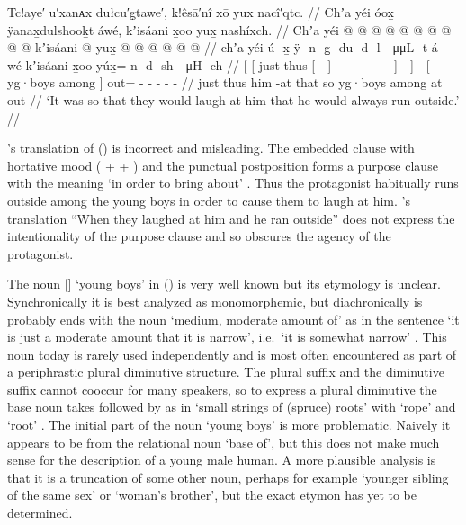 \ex\label{ex:89-148-run-out-to-get-laughed-at}%
%
\begingl
	\glpreamble	Tc!aye′ u′xanᴀx dułcu′g̣tawe′, k!êsā′nî xō yux nacî′qtc. //
	\glpreamble	Chʼa yéi óox̱ ÿanax̱dulshooḵt áwé, kʼisáani x̱oo yux̱ nashíxch. //
	\gla	{} {} Chʼa yéi {}  @ {} {}
			 @ {} @ {} @ {} @ {} @ {} @ {} @ {} @ {} {} {} {}
		 @ {}
		{} kʼisáani  @ {} {}
		yux̱ @  @ {} @ {} @ {} @ {} @ {} //
	\glb	{} {} chʼa yéi {} ú -x̱ {}
			ÿ- n- g̱- du- d- l-  -μμL {} {} -t {}
		á -wé
		{} kʼisáani x̱oo {} {}
		yúx̱= n- d- sh-  -μH -ch //
	\glc	{}[ {}[ just thus {}[  - {}]
			- - - - - - 
				- \· {}] - {}]
		 -
		{}[ yg·boys among \· {}]
		out= - - -  - - //
	\gld	{} {} just thus {} him -at {}
			 {} {} {} {} {} {} {} \·that {} \·so {}
		\rlap{it.is} {}
		{} yg·boys among \·at {}
		out  {} {} {} {} {} //
	\glft	‘It was so that they would laugh at him that he would always run outside.’
		//
\endgl
\xe

\citeauthor{swanton:1909}’s translation of (\lastx) is incorrect and misleading.
The embedded clause with hortative mood ( +  + ) and the punctual postposition  forms a purpose clause with the meaning ‘in order to bring about’ \parencites[106]{story:1966}[28]{naish:1966}[427–430, 58 fn.\ 65, 431 fn.\ 52, 225 fn.\ 22, ]{leer:1991}.
Thus the protagonist habitually runs outside among the young boys in order to cause them to laugh at him.
\citeauthor{swanton:1909}’s translation “When they laughed at him and he ran outside” does not express the intentionality of the purpose clause and so obscures the agency of the protagonist.

The noun  [] ‘young boys’ in (\lastx) is very well known but its etymology is unclear.
Synchronically it is best analyzed as monomorphemic, but diachronically  is probably ends with the noun  ‘medium, moderate amount of’ as in the sentence  ‘it is just a moderate amount that it is narrow’, i.e.\ ‘it is somewhat narrow’ \parencite[09/26]{leer:1973}.
This noun  today is rarely used independently and is most often encountered as part of a periphrastic plural diminutive structure.
The plural suffix  and the diminutive suffix  cannot cooccur for many speakers, so to express a plural diminutive the base noun takes  followed by  as in  ‘small strings of (spruce) roots’ with  ‘rope’ and  ‘root’ \parencite[76.97]{dauenhauer:1987}.
The initial part of the noun  ‘young boys’ is more problematic.
Naively it appears to be from the relational noun  ‘base of’, but this does not make much sense for the description of a young male human.
A more plausible analysis is that it is a truncation of some other noun, perhaps for example  ‘younger sibling of the same sex’ or  ‘woman’s brother’, but the exact etymon has yet to be determined.

